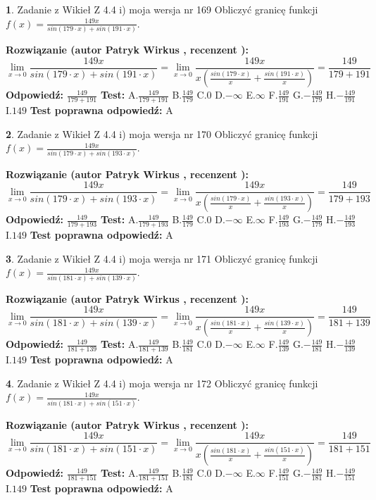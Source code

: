 \documentclass[12pt, a4paper]{article}
\theoremstyle{definition} %
\newtheorem{zad}{}
\newcommand{\zadStart}[1]{\begin{zad}#1\newline}
\newcommand{\zadStop}{\end{zad}}
\newcommand{\rozwStart}[2]{\noindent \textbf{Rozwiązanie (autor #1 , recenzent #2): }\newline}
\newcommand{\rozwStop}{\newline}
\newcommand{\odpStart}{\noindent \textbf{Odpowiedź:}\newline}
\newcommand{\odpStop}{\newline}
\newcommand{\testStart}{\noindent \textbf{Test:}\newline}
\newcommand{\testStop}{\newline}
\newcommand{\kluczStart}{\noindent \textbf{Test poprawna odpowiedź:}\newline}
\newcommand{\kluczStop}{\newline}
\begin{document}
\zadStart{Zadanie z Wikieł Z 4.4 i) moja wersja nr 169}
Obliczyć granicę funkcji $f(x)=\frac{149x}{sin(179\cdot x) +sin(191\cdot x)}$.
\zadStop
\rozwStart{Patryk Wirkus}{}
$$\lim\limits_{x\to 0}\frac{149x}{sin(179\cdot x) +sin(191\cdot x)}=\lim\limits_{x\to 0}\frac{149x}{x(\frac{sin(179\cdot x)}{x}+\frac{sin(191\cdot x)}{x})}=\frac{149}{179+191}$$
\rozwStop
\odpStart
$\frac{149}{179+191}$
\odpStop
\testStart
A.$\frac{149}{179+191}$
B.$\frac{149}{179}$
C.$0$
D.$-\infty$
E.$\infty$
F.$\frac{149}{191}$
G.$-\frac{149}{179}$
H.$-\frac{149}{191}$
I.$149$
\testStop
\kluczStart
A
\kluczStop



\zadStart{Zadanie z Wikieł Z 4.4 i) moja wersja nr 170}
Obliczyć granicę funkcji $f(x)=\frac{149x}{sin(179\cdot x) +sin(193\cdot x)}$.
\zadStop
\rozwStart{Patryk Wirkus}{}
$$\lim\limits_{x\to 0}\frac{149x}{sin(179\cdot x) +sin(193\cdot x)}=\lim\limits_{x\to 0}\frac{149x}{x(\frac{sin(179\cdot x)}{x}+\frac{sin(193\cdot x)}{x})}=\frac{149}{179+193}$$
\rozwStop
\odpStart
$\frac{149}{179+193}$
\odpStop
\testStart
A.$\frac{149}{179+193}$
B.$\frac{149}{179}$
C.$0$
D.$-\infty$
E.$\infty$
F.$\frac{149}{193}$
G.$-\frac{149}{179}$
H.$-\frac{149}{193}$
I.$149$
\testStop
\kluczStart
A
\kluczStop



\zadStart{Zadanie z Wikieł Z 4.4 i) moja wersja nr 171}
Obliczyć granicę funkcji $f(x)=\frac{149x}{sin(181\cdot x) +sin(139\cdot x)}$.
\zadStop
\rozwStart{Patryk Wirkus}{}
$$\lim\limits_{x\to 0}\frac{149x}{sin(181\cdot x) +sin(139\cdot x)}=\lim\limits_{x\to 0}\frac{149x}{x(\frac{sin(181\cdot x)}{x}+\frac{sin(139\cdot x)}{x})}=\frac{149}{181+139}$$
\rozwStop
\odpStart
$\frac{149}{181+139}$
\odpStop
\testStart
A.$\frac{149}{181+139}$
B.$\frac{149}{181}$
C.$0$
D.$-\infty$
E.$\infty$
F.$\frac{149}{139}$
G.$-\frac{149}{181}$
H.$-\frac{149}{139}$
I.$149$
\testStop
\kluczStart
A
\kluczStop



\zadStart{Zadanie z Wikieł Z 4.4 i) moja wersja nr 172}
Obliczyć granicę funkcji $f(x)=\frac{149x}{sin(181\cdot x) +sin(151\cdot x)}$.
\zadStop
\rozwStart{Patryk Wirkus}{}
$$\lim\limits_{x\to 0}\frac{149x}{sin(181\cdot x) +sin(151\cdot x)}=\lim\limits_{x\to 0}\frac{149x}{x(\frac{sin(181\cdot x)}{x}+\frac{sin(151\cdot x)}{x})}=\frac{149}{181+151}$$
\rozwStop
\odpStart
$\frac{149}{181+151}$
\odpStop
\testStart
A.$\frac{149}{181+151}$
B.$\frac{149}{181}$
C.$0$
D.$-\infty$
E.$\infty$
F.$\frac{149}{151}$
G.$-\frac{149}{181}$
H.$-\frac{149}{151}$
I.$149$
\testStop
\kluczStart
A
\kluczStop
\end{document}
